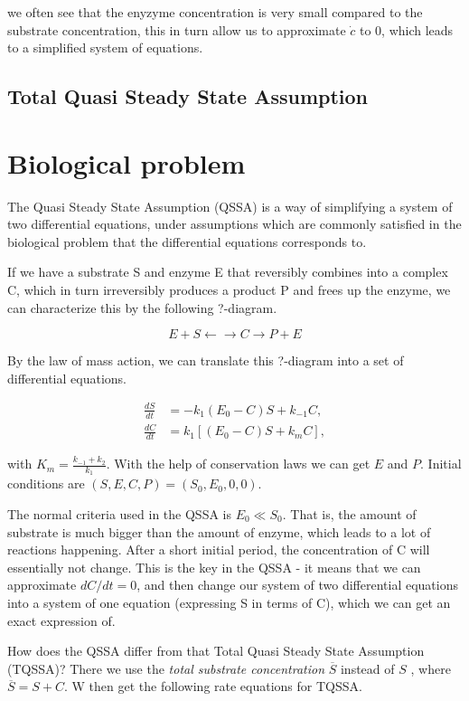 \documentclass[12pt]{report}
\begin{document}
we often see that the enyzyme concentration is very small compared to
the substrate concentration, this in turn allow us to approximate $\dot{c}$ to
0, which leads to a simplified system of equations.

\subsection{Total Quasi Steady State Assumption}

\section{Biological problem}

The Quasi Steady State Assumption (QSSA) is a way of simplifying a system of two differential equations, under assumptions which are commonly satisfied in the biological problem that the differential equations corresponds to.

If we have a substrate S and enzyme E that reversibly combines into a complex C, which in turn irreversibly produces a product P and frees up the enzyme, we can characterize this by the following ?-diagram.

\begin{equation}
E + S \leftarrow \rightarrow C \rightarrow P + E
\end{equation}

By the law of mass action, we can translate this ?-diagram into a set of differential equations.

\begin{align*}
\frac{dS}{dt} &= -k_1(E_0-C)S + k_{-1}C, \\
\frac{dC}{dt} &= k_1[(E_0-C)S + k_mC],
\end{align*}

with $K_m = \frac{k_{-1}+k_2}{k_1}$. With the help of conservation laws we can get $E$ and $P$. Initial conditions are $(S, E, C, P) = (S_0, E_0, 0, 0)$.

The normal criteria used in the QSSA is $ E_0 \ll S_0 $. That is, the amount of substrate is much bigger than the amount of enzyme, which leads to a lot of reactions happening. After a short initial period, the concentration of C will essentially not change. This is the key in the QSSA - it means that we can approximate $dC/dt=0$, and then change our system of two differential equations into a system of one equation (expressing S in terms of C), which we can get an exact expression of.

How does the QSSA differ from that Total Quasi Steady State Assumption (TQSSA)? There we use the \textit{total substrate concentration} $\overline{S}$ instead of $S$ \cite{Borghans}, where $\overline{S} = S + C$. W then get the following rate equations for TQSSA.
\end{document}
